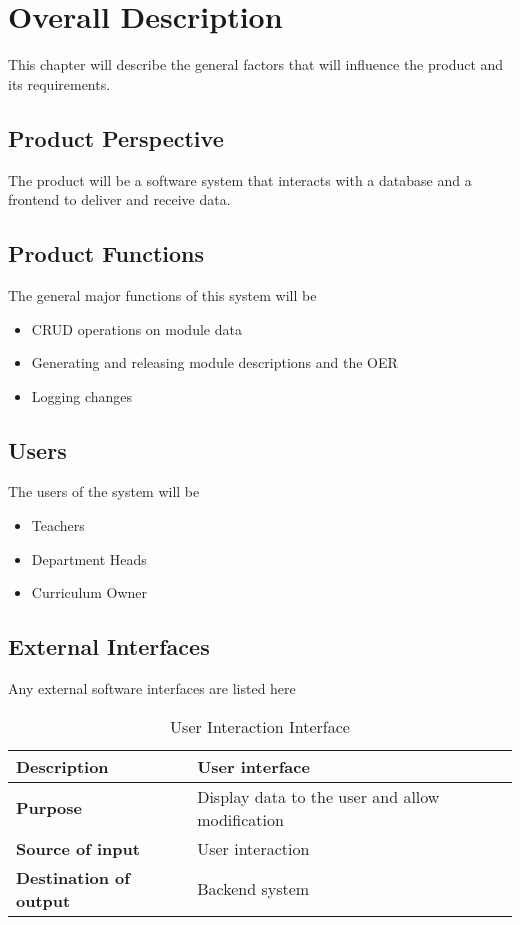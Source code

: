 \chapter{Overall Description}
This chapter will describe the general factors that will influence the product and its requirements.

\section{Product Perspective}
The product will be a software system that interacts with a database and a frontend to deliver and receive data.



\section{Product Functions}
The general major functions of this system will be
\begin{itemize}
	\item CRUD operations on module data
	\item Generating and releasing module descriptions and the \acrshort{OER}
	\item Logging changes
\end{itemize}

\section{Users}
The users of the system will be 
\begin{itemize}
	\item Teachers
	\item Department Heads
	\item Curriculum Owner
\end{itemize}

\newpage
\section{External Interfaces}
Any external software interfaces are listed here

\begin{table}[h!]
	\centering
	\caption{User Interaction Interface}
	\label{ui_interface_table}
	\begin{tabularx}{\textwidth}{l l}
		\hline
		\textbf{Description}           & User interface                                  \\ \hline
		\textbf{Purpose}               & Display data to the user and allow modification \\ \hline
		\textbf{Source of input}       & User interaction                                \\ \hline
		\textbf{Destination of output} & Backend system                                  \\ \hline
	\end{tabularx}
\end{table}

